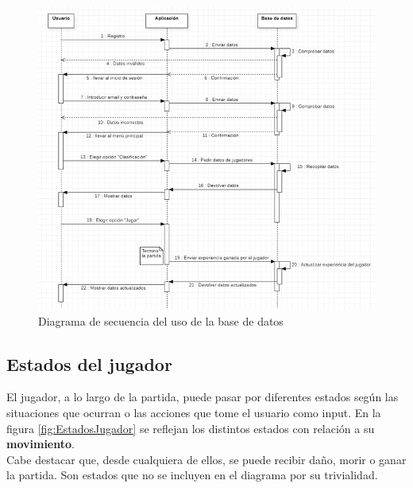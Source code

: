 \begin{figure}[h]
    \centering
    \includegraphics[scale=0.55]{img/DatabaseUsageFlowchart.jpg}
    \caption{Diagrama de secuencia del uso de la base de datos}
    \label{fig:DiagramaBBDD}
    \end{figure}

\subsection{Estados del jugador}
El jugador, a lo largo de la partida, puede pasar por diferentes estados según las situaciones que ocurran o las acciones que tome el usuario como input. En la figura \ref{fig:EstadosJugador} se reflejan los distintos estados con relación a su \textbf{movimiento}.\\
Cabe destacar que, desde cualquiera de ellos, se puede recibir daño, morir o ganar la partida. Son estados que no se incluyen en el diagrama por su trivialidad.

